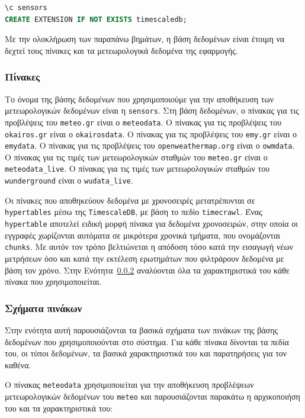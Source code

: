 \documentclass[a4paper,12pt]{article}
\makeatletter
\newcommand\subsubsubsection{\@startsection{paragraph}{4}{\z@}{-2.5ex\@plus -1ex \@minus -.25ex}{1.25ex \@plus .25ex}{\normalfont\normalsize\bfseries}}
\makeatother
\begin{document}
\begin{lstlisting}[language=SQL]
\c sensors
CREATE EXTENSION IF NOT EXISTS timescaledb;
\end{lstlisting}

Με την ολοκλήρωση των παραπάνω βημάτων, η βάση δεδομένων είναι έτοιμη να δεχτεί τους πίνακες και τα μετεωρολογικά δεδομένα της εφαρμογής.


\subsubsection{Πίνακες}\label{sec:database_tables}
Το όνομα της βάσης δεδομένων που χρησιμοποιούμε για την αποθήκευση των μετεωρολογικών δεδομένων είναι η \texttt{sensors}. Στη βάση δεδομένων, ο πίνακας για τις προβλέψεις του \texttt{meteo.gr} είναι ο \texttt{meteodata}. Ο πίνακας για τις προβλέψεις του \texttt{okairos.gr} είναι ο \texttt{okairosdata}. Ο πίνακας για τις προβλέψεις του \texttt{emy.gr} είναι ο \texttt{emydata}. Ο πίνακας για τις προβλέψεις του \texttt{openweathermap.org} είναι ο \texttt{owmdata}. Ο πίνακας για τις τιμές των μετεωρολογικών σταθμών του \texttt{meteo.gr} είναι ο \texttt{meteodata\_live}. Ο πίνακας για τις τιμές των μετεωρολογικών σταθμών του \texttt{wunderground} είναι ο \texttt{wudata\_live}.

Οι πίνακες που αποθηκεύουν δεδομένα με χρονοσειρές μετατρέπονται σε \texttt{hypertables} μέσω της \texttt{TimescaleDB}, με βάση το πεδίο \texttt{timecrawl}. Ένας \texttt{hypertable} αποτελεί ειδική μορφή πίνακα για δεδομένα χρονοσειρών, στην οποία οι εγγραφές χωρίζονται αυτόματα σε μικρότερα χρονικά τμήματα, που ονομάζονται \texttt{chunks}. Με αυτόν τον τρόπο βελτιώνεται η απόδοση τόσο κατά την εισαγωγή νέων μετρήσεων όσο και κατά την εκτέλεση ερωτημάτων που φιλτράρουν δεδομένα με βάση τον χρόνο. Στην Ενότητα~\ref{sec:database_schemas} αναλύονται όλα τα χαρακτηριστικά του κάθε πίνακα που χρησιμοποιείται.


\subsubsection{Σχήματα πινάκων}\label{sec:database_schemas}
Στην ενότητα αυτή παρουσιάζονται τα βασικά σχήματα των πινάκων της βάσης δεδομένων που χρησιμοποιούνται στο σύστημα. Για κάθε πίνακα δίνονται τα πεδία του, οι τύποι δεδομένων, τα βασικά χαρακτηριστικά του και παρατηρήσεις για τον καθένα.

\subsubsubsection{Πίνακας \texttt{meteodata}}

Ο πίνακας \texttt{meteodata} χρησιμοποιείται για την αποθήκευση προβλέψεων μετεωρολογικών δεδομένων του \texttt{meteo} και παρουσιάζονται παρακάτω η αρχικοποιήση του και τα χαρακτηριστικά του:
\end{document}
